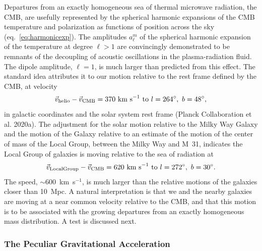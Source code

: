 \documentclass[fleqn,12pt]{article}
\newcommand{\beq}{\begin{equation}}
\newcommand{\eeq}{\end{equation}}
\begin{document}
Departures from an exactly homogeneous sea of thermal microwave radiation, the CMB, are usefully represented by the spherical harmonic expansions of the CMB temperature and polarization as functions of position across the sky (eq.~\ref{eq:harmonicexp}). The amplitudes $a_\ell^m$ of the spherical harmonic expansion of the temperature at degree $\ell > 1$ are convincingly demonstrated to be remnants of the decoupling of acoustic oscillations in the plasma-radiation fluid. The dipole amplitude, $\ell = 1$, is much larger than predicted from this effect. The standard idea attributes it to our motion relative to the rest frame defined by the CMB, at velocity  
\beq
{\vec v}_{\rm helio} - {\vec v}_{\rm CMB} = 370\hbox{ km s}^{-1}\hbox{ to } l = 264^\circ,\ b=48^\circ,\label{eq:heliocen_wrt_cmb}
\eeq
in galactic coordinates and the solar system rest frame (Planck Collaboration et al. 2020a). The adjustment for the solar motion relative to the Milky Way Galaxy and the motion of the Galaxy relative to an estimate of the motion of the center of mass of the Local Group, between the Milky Way and M~31, indicates the Local Group of galaxies is moving relative to the sea of radiation at  
\beq
{\vec v}_{\rm Local Group} - {\vec v}_{\rm CMB}= 620\hbox{ km s}^{-1}\hbox{ to } l = 272^\circ,\ b=30^\circ. \label{eq:LG_wrt_cmb}
\eeq
The speed, $\sim 600$~km~s$^{-1}$, is much larger than the relative motions of the galaxies closer than 10~Mpc. A natural interpretation is that we and the nearby galaxies are moving at a near common velocity relative to the CMB, and that this motion is to be associated with the growing departures from an exactly homogeneous mass distribution. A test is discussed next.

\subsubsection{The Peculiar Gravitational Acceleration} \label{sec:localgravity}
\end{document}

